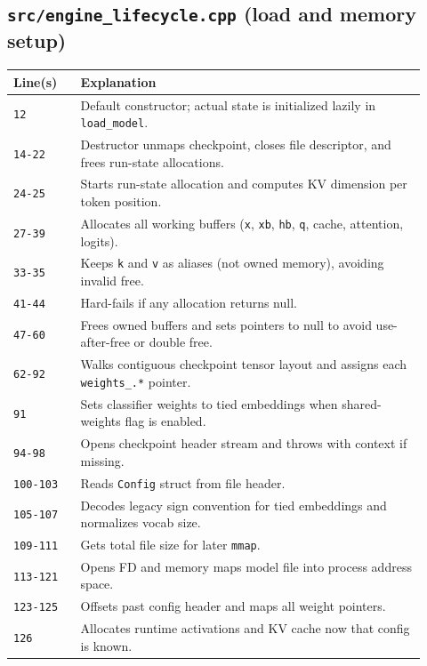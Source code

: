 \documentclass[11pt]{article}
\begin{document}
\subsection{\texttt{src/engine\_lifecycle.cpp} (load and memory setup)}
\begin{longtable}{p{0.15\linewidth} p{0.77\linewidth}}
\toprule
\textbf{Line(s)} & \textbf{Explanation} \\
\midrule
\endhead
\texttt{12} & Default constructor; actual state is initialized lazily in \texttt{load\_model}. \\
\texttt{14-22} & Destructor unmaps checkpoint, closes file descriptor, and frees run-state allocations. \\
\texttt{24-25} & Starts run-state allocation and computes KV dimension per token position. \\
\texttt{27-39} & Allocates all working buffers (\texttt{x}, \texttt{xb}, \texttt{hb}, \texttt{q}, cache, attention, logits). \\
\texttt{33-35} & Keeps \texttt{k} and \texttt{v} as aliases (not owned memory), avoiding invalid free. \\
\texttt{41-44} & Hard-fails if any allocation returns null. \\
\texttt{47-60} & Frees owned buffers and sets pointers to null to avoid use-after-free or double free. \\
\texttt{62-92} & Walks contiguous checkpoint tensor layout and assigns each \texttt{weights\_.*} pointer. \\
\texttt{91} & Sets classifier weights to tied embeddings when shared-weights flag is enabled. \\
\texttt{94-98} & Opens checkpoint header stream and throws with context if missing. \\
\texttt{100-103} & Reads \texttt{Config} struct from file header. \\
\texttt{105-107} & Decodes legacy sign convention for tied embeddings and normalizes vocab size. \\
\texttt{109-111} & Gets total file size for later \texttt{mmap}. \\
\texttt{113-121} & Opens FD and memory maps model file into process address space. \\
\texttt{123-125} & Offsets past config header and maps all weight pointers. \\
\texttt{126} & Allocates runtime activations and KV cache now that config is known. \\
\bottomrule
\end{longtable}
\end{document}
